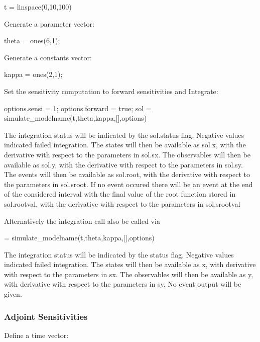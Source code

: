 \begin{DoxyCode}
t = linspace(0,10,100)
\end{DoxyCode}


Generate a parameter vector\+:


\begin{DoxyCode}
theta = ones(6,1);
\end{DoxyCode}


Generate a constants vector\+:


\begin{DoxyCode}
kappa = ones(2,1);
\end{DoxyCode}


Set the sensitivity computation to forward sensitivities and Integrate\+:


\begin{DoxyCode}
options.sensi = 1;
options.forward = \textcolor{keyword}{true};
sol = simulate\_modelname(t,theta,kappa,[],options)
\end{DoxyCode}


The integration status will be indicated by the sol.\+status flag. Negative values indicated failed integration. The states will then be available as sol.\+x, with the derivative with respect to the parameters in sol.\+sx. The observables will then be available as sol.\+y, with the derivative with respect to the parameters in sol.\+sy. The events will then be available as sol.\+root, with the derivative with respect to the parameters in sol.\+sroot. If no event occured there will be an event at the end of the considered interval with the final value of the root function stored in sol.\+rootval, with the derivative with respect to the parameters in sol.\+srootval

Alternatively the integration call also be called via


\begin{DoxyCode}
[status,t,x,y,sx,sy] = simulate\_modelname(t,theta,kappa,[],options)
\end{DoxyCode}


The integration status will be indicated by the status flag. Negative values indicated failed integration. The states will then be available as x, with derivative with respect to the parameters in sx. The observables will then be available as y, with derivative with respect to the parameters in sy. No event output will be given.\hypertarget{def_simu_adjoint}{}\subsubsection{Adjoint Sensitivities}\label{def_simu_adjoint}
Define a time vector\+:


